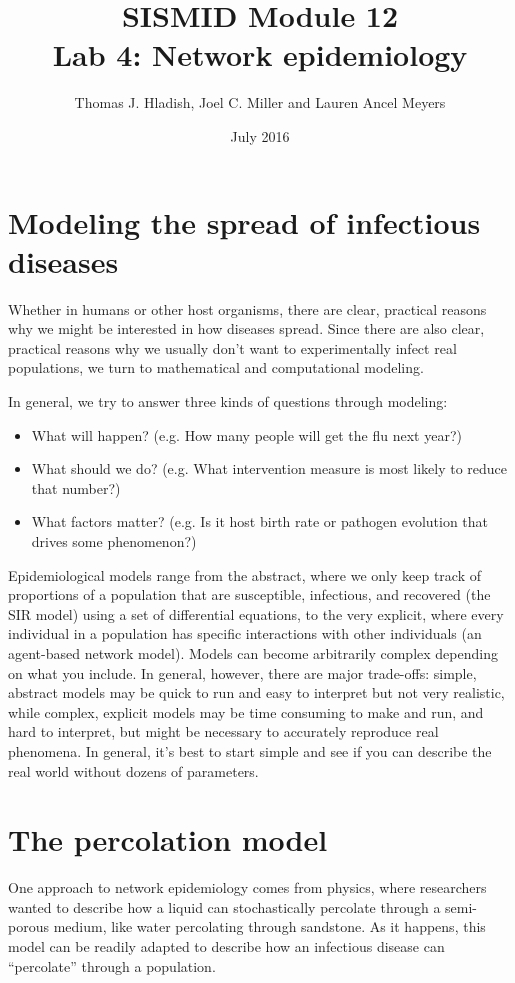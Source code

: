 \documentclass{article}
\begin{document}
\title{SISMID Module 12\\Lab 4: Network epidemiology}
\author{Thomas J. Hladish, Joel C. Miller and Lauren Ancel Meyers}
\date{July 2016}
\maketitle


\section*{Modeling the spread of infectious diseases}
Whether in humans or other host organisms, there are clear, practical reasons
why we might be interested in how diseases spread.  Since there are also clear,
practical reasons why we usually don't want to experimentally infect real
populations, we turn to mathematical and computational modeling.

In general, we try to answer three kinds of questions through modeling:
\begin{itemize}
 \item What will happen? (e.g. How many people will get the flu next year?)
 \item What should we do? (e.g. What intervention measure is most likely to
reduce that number?)
 \item What factors matter? (e.g. Is it host birth rate or pathogen evolution
that drives some phenomenon?)
\end{itemize}

Epidemiological models range from the abstract, where we only keep track of
proportions of a population that are susceptible, infectious, and recovered (the
SIR model) using a set of differential equations, to the very explicit, where
every individual in a population has specific interactions with other
individuals (an agent-based network model).  Models can become arbitrarily
complex depending on what you include.  In general, however, there are major
trade-offs: simple, abstract models may be quick to run and easy to interpret but
not very realistic, while complex, explicit models may be time consuming to make
and run, and hard to interpret, but might be necessary to accurately reproduce
real phenomena.  In general, it's best to start simple and see if you can
describe the real world without dozens of parameters.

\section*{The percolation model}
\label{perc}
One approach to network epidemiology comes from physics, where researchers
wanted to describe how a liquid can stochastically percolate through a
semi-porous medium, like water percolating through sandstone.  As it happens,
this model can be readily adapted to describe how an infectious disease can
``percolate'' through a population.
\end{document}
